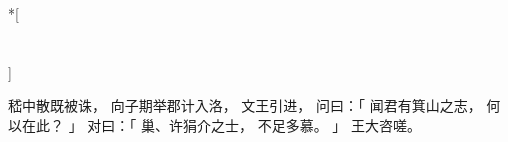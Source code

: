 
\switchcolumn[0]*[\section{}]

嵇中散既被诛，
向子期举郡计入洛，
文王引进，
问曰：「
    闻君有箕山之志，
    何以在此？
」
对曰：「
    巢、许狷介之士，
    不足多慕。
」
王大咨嗟。

\switchcolumn



